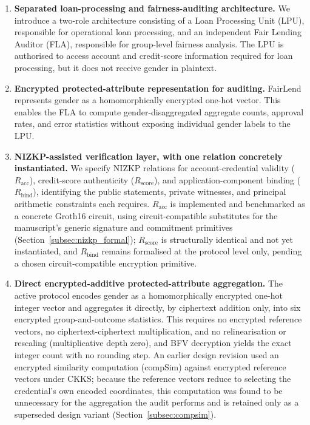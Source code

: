 \documentclass[a4paper,fleqn]{cas-dc}
\begin{document}
\begin{enumerate}
    \item \textbf{Separated loan-processing and fairness-auditing architecture.}
    We introduce a two-role architecture consisting of a Loan Processing Unit (LPU), responsible for operational loan processing, and an independent Fair Lending Auditor (FLA), responsible for group-level fairness analysis. The LPU is authorised to access account and credit-score information required for loan processing, but it does not receive gender in plaintext.

    \item \textbf{Encrypted protected-attribute representation for auditing.}
    FairLend represents gender as a homomorphically encrypted one-hot vector. This enables the FLA to compute gender-disaggregated aggregate counts, approval rates, and error statistics without exposing individual gender labels to the LPU.

    \item \textbf{NIZKP-assisted verification layer, with one relation concretely instantiated.} We specify NIZKP relations for account-credential validity ($R_{\mathrm{acc}}$), credit-score authenticity ($R_{\mathrm{score}}$), and application-component binding ($R_{\mathrm{bind}}$), identifying the public statements, private witnesses, and principal arithmetic constraints each requires. $R_{\mathrm{acc}}$ is implemented and benchmarked as a concrete Groth16 circuit, using circuit-compatible substitutes for the manuscript's generic signature and commitment primitives (Section~\ref{subsec:nizkp_formal}); $R_{\mathrm{score}}$ is structurally identical and not yet instantiated, and $R_{\mathrm{bind}}$ remains formalised at the protocol level only, pending a chosen circuit-compatible encryption primitive.

    \item \textbf{Direct encrypted-additive protected-attribute aggregation.} The active protocol encodes gender as a homomorphically encrypted one-hot integer vector and aggregates it directly, by ciphertext addition only, into six encrypted group-and-outcome statistics. This requires no encrypted reference vectors, no ciphertext-ciphertext multiplication, and no relinearisation or rescaling (multiplicative depth zero), and BFV decryption yields the exact integer count with no rounding step. An earlier design revision used an encrypted similarity computation (\textsf{compSim}) against encrypted reference vectors under CKKS; because the reference vectors reduce to selecting the credential's own encoded coordinates, this computation was found to be unnecessary for the aggregation the audit performs and is retained only as a superseded design variant (Section~\ref{subsec:compsim}).


\end{enumerate}
\end{document}
